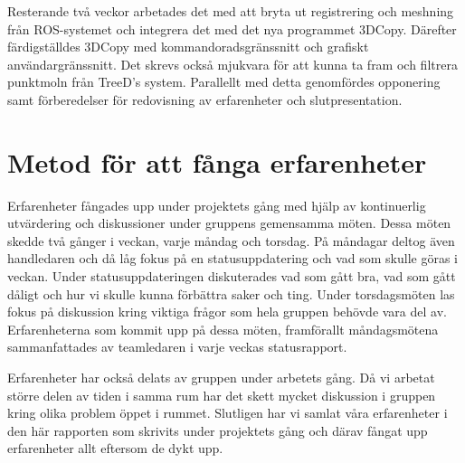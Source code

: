 Resterande två veckor arbetades det med att bryta ut registrering och meshning från ROS-systemet och integrera det med det nya programmet 3DCopy. Därefter färdigställdes 3DCopy med kommandoradsgränssnitt och grafiskt användargränssnitt. Det skrevs också mjukvara för att kunna ta fram och filtrera punktmoln från TreeD's system. Parallellt med detta genomfördes opponering samt förberedelser för redovisning av erfarenheter och slutpresentation.  


\section{Metod för att fånga erfarenheter}

Erfarenheter fångades upp under projektets gång med hjälp av kontinuerlig utvärdering och diskussioner under gruppens gemensamma möten. Dessa möten skedde två gånger i veckan, varje måndag och torsdag. På måndagar deltog även handledaren och då låg fokus på en statusuppdatering och vad som skulle göras i veckan. Under statusuppdateringen diskuterades vad som gått bra, vad som gått dåligt och hur vi skulle kunna förbättra saker och ting. Under torsdagsmöten las fokus på diskussion kring viktiga frågor som hela gruppen behövde vara del av. Erfarenheterna som kommit upp på dessa möten, framförallt måndagsmötena sammanfattades av teamledaren i varje veckas statusrapport.

Erfarenheter har också delats av gruppen under arbetets gång. Då vi arbetat större delen av tiden i samma rum har det skett mycket diskussion i gruppen kring olika problem öppet i rummet. Slutligen har vi samlat våra erfarenheter i den här rapporten som skrivits under projektets gång och därav fångat upp erfarenheter allt eftersom de dykt upp.


